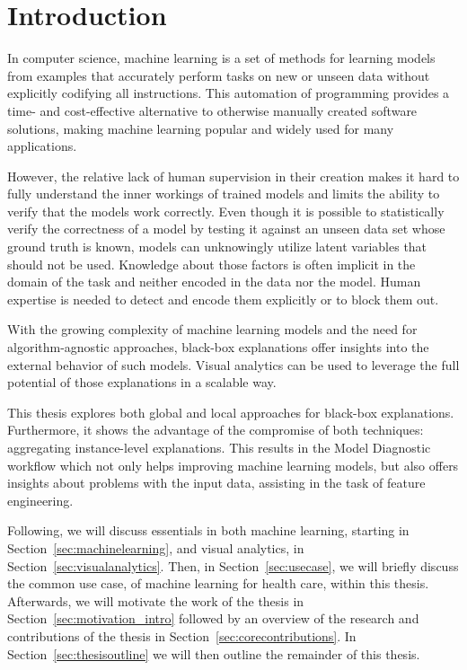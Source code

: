 \chapter{Introduction}
In computer science, machine learning is a set of methods for learning models from examples that accurately perform tasks on new or unseen data without explicitly codifying all instructions. This automation of programming provides a time- and cost-effective alternative to otherwise manually created software solutions, making machine learning popular and widely used for many applications.

However, the relative lack of human supervision in their creation makes it hard to fully understand the inner workings of trained models and limits the ability to verify that the models work correctly. Even though it is possible to statistically verify the correctness of a model by testing it against an unseen data set whose ground truth is known, models can unknowingly utilize latent variables that should not be used. Knowledge about those factors is often implicit in the domain of the task and neither encoded in the data nor the model. Human expertise is needed to detect and encode them explicitly or to block them out.

With the growing complexity of machine learning models and the need for algorithm-agnostic approaches, black-box explanations offer insights into the external behavior of such models.
Visual analytics can be used to leverage the full potential of those explanations in a scalable way.

This thesis explores both global and local approaches for black-box explanations.
Furthermore, it shows the advantage of the compromise of both techniques: aggregating instance-level explanations.
This results in the Model Diagnostic workflow which not only helps improving machine learning models, but also offers insights about problems with the input data, assisting in the task of feature engineering.

Following, we will discuss essentials in both machine learning, starting in Section~\ref{sec:machinelearning}, and visual analytics, in Section~\ref{sec:visualanalytics}.
Then, in Section~\ref{sec:usecase}, we will briefly discuss the common use case, of machine learning for health care, within this thesis.
Afterwards, we will motivate the work of the thesis in Section~\ref{sec:motivation_intro} followed by an overview of the research and contributions of the thesis in Section~\ref{sec:corecontributions}.
In Section~\ref{sec:thesisoutline} we will then outline the remainder of this thesis.

